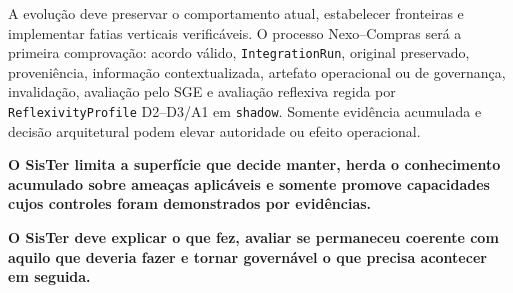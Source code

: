 \documentclass[11pt,a4paper,oneside]{article}
\begin{document}
A evolução deve preservar o comportamento atual, estabelecer fronteiras e implementar fatias verticais verificáveis. O processo Nexo--Compras será a primeira comprovação: acordo válido, \texttt{IntegrationRun}, original preservado, proveniência, informação contextualizada, artefato operacional ou de governança, invalidação, avaliação pelo SGE e avaliação reflexiva regida por \texttt{ReflexivityProfile} D2--D3/A1 em \texttt{shadow}. Somente evidência acumulada e decisão arquitetural podem elevar autoridade ou efeito operacional.

\begin{principio}
\centering
\textbf{O SisTer limita a superfície que decide manter, herda o conhecimento acumulado sobre ameaças aplicáveis e somente promove capacidades cujos controles foram demonstrados por evidências.}
\end{principio}

\begin{principio}
\centering
\textbf{O SisTer deve explicar o que fez, avaliar se permaneceu coerente com aquilo que deveria fazer e tornar governável o que precisa acontecer em seguida.}
\end{principio}

\appendix
\end{document}
